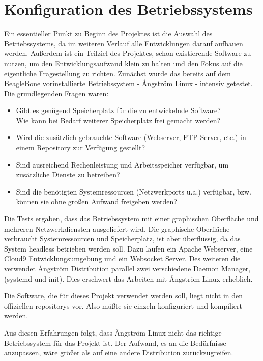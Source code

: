 \chapter{Konfiguration des Betriebssystems}

Ein essentieller Punkt zu Beginn des Projektes ist die Auswahl des Betriebssystems, da im weiteren Verlauf alle Entwicklungen darauf aufbauen werden. Außerdem ist ein Teilziel des Projektes, schon existierende Software zu nutzen, um den Entwicklungsaufwand klein zu halten und den Fokus auf die eigentliche Fragestellung zu richten. Zunächst wurde das bereits auf dem BeagleBone vorinstallierte Betriebssystem - {\AA}ngström Linux - intensiv getestet.\\

\noindent Die grundlegenden Fragen waren:

\begin{itemize}
\item Gibt es genügend Speicherplatz für die zu entwickelnde Software?\\
Wie kann bei Bedarf weiterer Speicherplatz frei gemacht werden?
\item Wird die zusätzlich gebrauchte Software (Webserver, FTP Server, etc.) in einem Repository zur Verfügung gestellt?
\item Sind ausreichend Rechenleistung und Arbeitsspeicher verfügbar, um zusätzliche Dienste zu betreiben?
\item Sind die benötigten Systemressourcen (Netzwerkports u.a.) verfügbar, bzw. können sie ohne großen Aufwand freigeben werden?
\end{itemize}

Die Tests ergaben, dass das Betriebssystem mit einer graphischen Oberfläche und mehreren Netzwerkdiensten ausgeliefert wird. Die graphische Oberfläche verbraucht Systemressourcen und Speicherplatz, ist aber überflüssig, da das System headless betrieben werden soll. Dazu laufen ein Apache Webserver, eine Cloud9 Entwicklungsumgebung und ein Websocket Server. Des weiteren die verwendet {\AA}ngström Distribution parallel zwei verschiedene Daemon Manager, (\gls{systemd} und \gls{init}). Dies erschwert das Arbeiten mit {\AA}ngström Linux erheblich.

Die Software, die für dieses Projekt verwendet werden soll, liegt nicht in den offiziellen \glspl{repository} vor. Also müßte sie einzeln konfiguriert und kompiliert werden.

Aus diesen Erfahrungen folgt, dass {\AA}ngström Linux nicht das richtige Betriebssystem für das Projekt ist. Der Aufwand, es an die Bedürfnisse anzupassen, wäre größer als auf eine andere Distribution zurückzugreifen.\\

